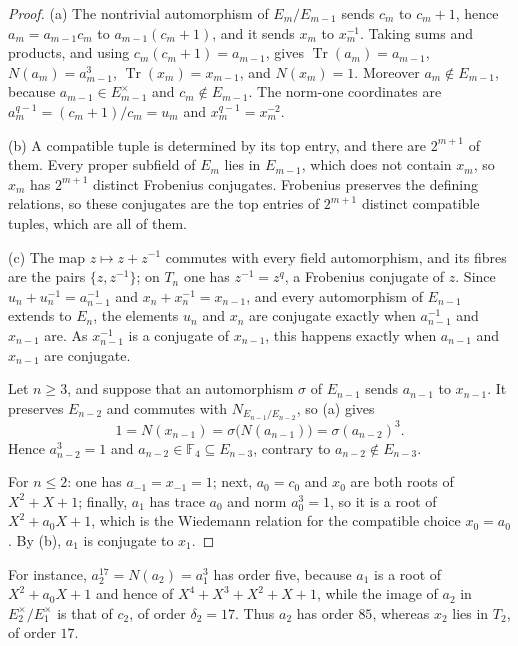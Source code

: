 \documentclass[11pt]{article}
\theoremstyle{definition}
\theoremstyle{remark}
\begin{document}
\begin{proof}
(a) The nontrivial automorphism of $E_m/E_{m-1}$ sends $c_m$ to $c_m+1$,
hence $a_m=a_{m-1}c_m$ to $a_{m-1}(c_m+1)$, and it sends $x_m$ to $x_m^{-1}$.
Taking sums and products, and using $c_m(c_m+1)=a_{m-1}$, gives
$\operatorname{Tr}(a_m)=a_{m-1}$, $N(a_m)=a_{m-1}^3$,
$\operatorname{Tr}(x_m)=x_{m-1}$, and $N(x_m)=1$.  Moreover
$a_m\notin E_{m-1}$, because $a_{m-1}\in E_{m-1}^{\times}$ and
$c_m\notin E_{m-1}$.  The norm-one coordinates are
$a_m^{q-1}=(c_m+1)/c_m=u_m$ and $x_m^{q-1}=x_m^{-2}$.

(b) A compatible tuple is determined by its top entry, and there are
$2^{m+1}$ of them.  Every proper subfield of $E_m$ lies in $E_{m-1}$, which
does not contain $x_m$, so $x_m$ has $2^{m+1}$ distinct Frobenius conjugates.
Frobenius preserves the defining relations, so these conjugates are the top
entries of $2^{m+1}$ distinct compatible tuples, which are all of them.

(c) The map $z\mapsto z+z^{-1}$ commutes with every field automorphism, and
its fibres are the pairs $\{z,z^{-1}\}$; on $T_n$ one has $z^{-1}=z^q$, a
Frobenius conjugate of $z$.  Since $u_n+u_n^{-1}=a_{n-1}^{-1}$ and
$x_n+x_n^{-1}=x_{n-1}$, and every automorphism of $E_{n-1}$ extends to
$E_n$, the elements $u_n$ and $x_n$ are conjugate exactly when
$a_{n-1}^{-1}$ and $x_{n-1}$ are.  As $x_{n-1}^{-1}$ is a conjugate of
$x_{n-1}$, this happens exactly when $a_{n-1}$ and $x_{n-1}$ are conjugate.

Let $n\geq3$, and suppose that an automorphism $\sigma$ of $E_{n-1}$ sends
$a_{n-1}$ to $x_{n-1}$.  It preserves $E_{n-2}$ and commutes with
$N_{E_{n-1}/E_{n-2}}$, so (a) gives
\[
 1=N(x_{n-1})=\sigma\bigl(N(a_{n-1})\bigr)=\sigma(a_{n-2})^3.
\]
Hence $a_{n-2}^3=1$ and $a_{n-2}\in\mathbb F_4\subseteq E_{n-3}$, contrary to
$a_{n-2}\notin E_{n-3}$.

For $n\leq2$: one has $a_{-1}=x_{-1}=1$; next, $a_0=c_0$ and $x_0$ are both
roots of $X^2+X+1$; finally, $a_1$ has trace $a_0$ and norm $a_0^3=1$, so it
is a root of $X^2+a_0X+1$, which is the Wiedemann relation for the
compatible choice $x_0=a_0$.  By (b), $a_1$ is conjugate to $x_1$.
\end{proof}

For instance, $a_2^{17}=N(a_2)=a_1^3$ has order five, because $a_1$ is a
root of $X^2+a_0X+1$ and hence of $X^4+X^3+X^2+X+1$, while the image of
$a_2$ in $E_2^{\times}/E_1^{\times}$ is that of $c_2$, of order
$\delta_2=17$.  Thus $a_2$ has order $85$, whereas $x_2$ lies in $T_2$, of
order $17$.
\end{document}
